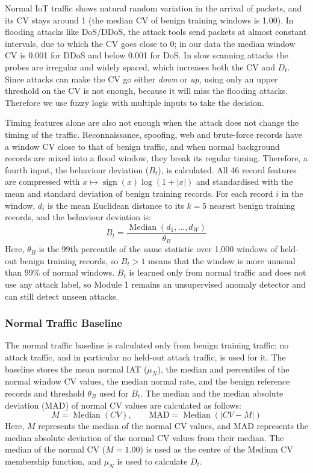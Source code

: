 \documentclass[]{interact}
\theoremstyle{plain}%
\theoremstyle{definition}
\theoremstyle{remark}
\begin{document}
Normal IoT traffic shows natural random variation in the arrival of packets, and its CV stays around 1 (the median CV of benign training windows is 1.00). In flooding attacks like DoS/DDoS, the attack tools send packets at almost constant intervals, due to which the CV goes close to 0; in our data the median window CV is 0.001 for DDoS and below 0.001 for DoS. In slow scanning attacks the probes are irregular and widely spaced, which increases both the CV and $D_t$. Since attacks can make the CV go either \emph{down} or \emph{up}, using only an upper threshold on the CV is not enough, because it will miss the flooding attacks. Therefore we use fuzzy logic with multiple inputs to take the decision.

Timing features alone are also not enough when the attack does not change the timing of the traffic. Reconnaissance, spoofing, web and brute-force records have a window CV close to that of benign traffic, and when normal background records are mixed into a flood window, they break its regular timing. Therefore, a fourth input, the behaviour deviation ($B_t$), is calculated. All 46 record features are compressed with $x \mapsto \operatorname{sign}(x)\log(1+|x|)$ and standardised with the mean and standard deviation of benign training records. For each record $i$ in the window, $d_i$ is the mean Euclidean distance to its $k=5$ nearest benign training records, and the behaviour deviation is:
\begin{equation}
  B_t = \frac{\operatorname{Median}\left(d_1, \ldots, d_W\right)}{\theta_B}
\end{equation}
Here, $\theta_B$ is the 99th percentile of the same statistic over 1,000 windows of held-out benign training records, so $B_t > 1$ means that the window is more unusual than 99\% of normal windows. $B_t$ is learned only from normal traffic and does not use any attack label, so Module 1 remains an unsupervised anomaly detector and can still detect unseen attacks.

\subsubsection{Normal Traffic Baseline}\label{sec:baseline}
The normal traffic baseline is calculated only from benign training traffic; no attack traffic, and in particular no held-out attack traffic, is used for it. The baseline stores the mean normal IAT ($\mu_N$), the median and percentiles of the normal window CV values, the median normal rate, and the benign reference records and threshold $\theta_B$ used for $B_t$. The median and the median absolute deviation (MAD) of normal CV values are calculated as follows:
\begin{equation}
  M = \operatorname{Median}(CV), \qquad
  \mathrm{MAD} = \operatorname{Median}\left(\left|CV - M\right|\right)
\end{equation}
Here, $M$ represents the median of the normal CV values, and $\mathrm{MAD}$ represents the median absolute deviation of the normal CV values from their median. The median of the normal CV ($M = 1.00$) is used as the centre of the Medium CV membership function, and $\mu_N$ is used to calculate $D_t$.
\end{document}
